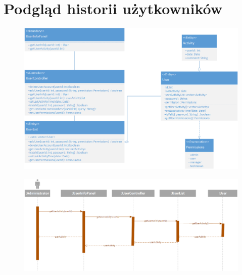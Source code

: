 \documentclass[11pt, a4paper, oneside]{report}
\begin{document}
\section{Podgląd historii użytkowników}
\begin{figure}[H]
\centering
\includegraphics[scale=0.5]{podglad_historii_class.png}
\end{figure}
\begin{figure}[H]
\centering
\includegraphics[scale=0.5]{podglad_historii_sequence.png}
\end{figure}
\end{document}
